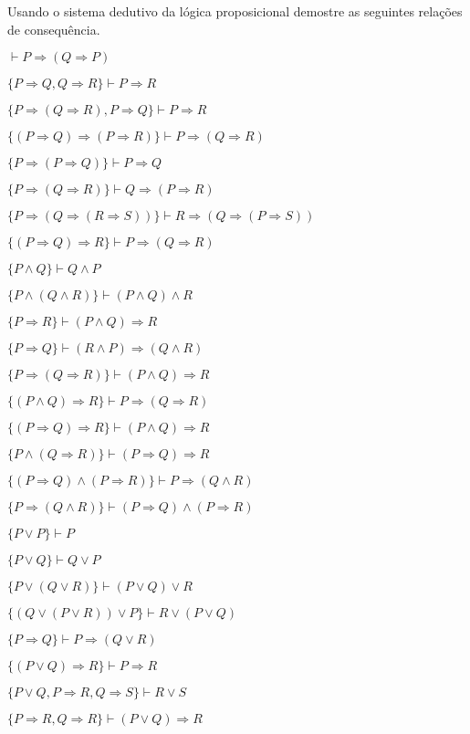 \begin{questao}\label{test:LPro1}
  Usando o sistema dedutivo da lógica proposicional demostre as seguintes relações de consequência.
\end{questao}
\begin{exerList}
  \item $\vdash P \Rightarrow (Q \Rightarrow P)$
  \item $\{P \Rightarrow Q, Q \Rightarrow R\} \vdash P \Rightarrow R$
  \item $\{P \Rightarrow (Q \Rightarrow R), P \Rightarrow Q\} \vdash P \Rightarrow R$
  \item $\{(P \Rightarrow Q) \Rightarrow (P \Rightarrow R)\} \vdash P \Rightarrow (Q \Rightarrow R)$
  \item $\{P \Rightarrow (P \Rightarrow Q)\} \vdash P \Rightarrow Q$
  \item $\{P \Rightarrow (Q \Rightarrow R)\} \vdash Q \Rightarrow (P \Rightarrow R)$
  \item $\{P \Rightarrow (Q \Rightarrow (R \Rightarrow S))\} \vdash R \Rightarrow (Q \Rightarrow (P \Rightarrow S))$
  \item $\{(P \Rightarrow Q) \Rightarrow R\} \vdash P \Rightarrow (Q \Rightarrow R)$
  \item $\{P \land  Q\} \vdash Q \land  P$
  \item $\{P \land  (Q \land  R)\} \vdash (P \land  Q) \land  R$
  \item $\{P \Rightarrow R\} \vdash (P \land  Q) \Rightarrow R$
  \item $\{P \Rightarrow Q\} \vdash (R \land  P) \Rightarrow (Q \land  R)$
  \item $\{P \Rightarrow (Q \Rightarrow R)\} \vdash (P \land  Q) \Rightarrow R$
  \item $\{(P \land  Q) \Rightarrow R\} \vdash P \Rightarrow (Q \Rightarrow R)$
  \item $\{(P \Rightarrow Q) \Rightarrow R\} \vdash (P \land  Q) \Rightarrow R$
  \item $\{P \land  (Q \Rightarrow R)\} \vdash (P \Rightarrow Q) \Rightarrow R$
  \item $\{(P \Rightarrow Q) \land  (P \Rightarrow R)\} \vdash P \Rightarrow (Q \land  R)$
  \item $\{P \Rightarrow (Q \land  R)\} \vdash (P \Rightarrow Q) \land  (P \Rightarrow R)$
  \item $\{P \lor P\} \vdash P$
  \item $\{P \lor Q\} \vdash Q \lor P$
  \item $\{P \lor (Q \lor R)\} \vdash (P \lor Q) \lor R$
  \item $\{(Q \lor (P \lor R)) \lor P\} \vdash R \lor (P \lor Q)$
  \item $\{P \Rightarrow Q\} \vdash P \Rightarrow (Q \lor R)$
  \item $\{(P \lor Q) \Rightarrow R\} \vdash P \Rightarrow R$
  \item $\{P \lor Q, P \Rightarrow R, Q \Rightarrow S\} \vdash R \lor S$
  \item $\{P \Rightarrow R, Q \Rightarrow R\} \vdash (P \lor Q) \Rightarrow R$
\end{exerList}

